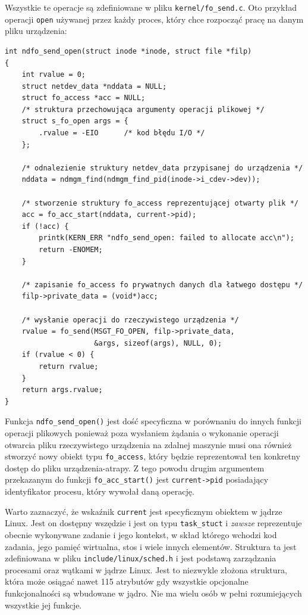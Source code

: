 \documentclass[11pt]{scrartcl}
\begin{document}
Wszystkie te operacje są zdefiniowane w pliku \texttt{kernel/fo\_send.c}. Oto przykład operacji \texttt{open} używanej przez każdy proces, który chce rozpocząć pracę na danym pliku urządzenia:

\begin{verbatim}
int ndfo_send_open(struct inode *inode, struct file *filp)
{
    int rvalue = 0;
    struct netdev_data *nddata = NULL;
    struct fo_access *acc = NULL;
    /* struktura przechowująca argumenty operacji plikowej */
    struct s_fo_open args = {
        .rvalue = -EIO      /* kod błędu I/O */
    };

    /* odnalezienie struktury netdev_data przypisanej do urządzenia */
    nddata = ndmgm_find(ndmgm_find_pid(inode->i_cdev->dev));

    /* stworzenie struktury fo_access reprezentującej otwarty plik */
    acc = fo_acc_start(nddata, current->pid);
    if (!acc) {
        printk(KERN_ERR "ndfo_send_open: failed to allocate acc\n");
        return -ENOMEM;
    }

    /* zapisanie fo_access fo prywatnych danych dla łatwego dostępu */
    filp->private_data = (void*)acc;

    /* wysłanie operacji do rzeczywistego urządzenia */
    rvalue = fo_send(MSGT_FO_OPEN, filp->private_data,
                     &args, sizeof(args), NULL, 0);
    if (rvalue < 0) {
        return rvalue;
    }
    return args.rvalue;
}
\end{verbatim}

Funkcja \texttt{ndfo\_send\_open()} jest dość specyficzna w porównaniu do innych funkcji operacji plikowych ponieważ poza wysłaniem żądania o wykonanie operacji otwarcia pliku rzeczywistego urządzenia na zdalnej maszynie musi ona również stworzyć nowy obiekt typu \texttt{fo\_access}, który będzie reprezentował ten konkretny dostęp do pliku urządzenia-atrapy. Z tego powodu drugim argumentem przekazanym do funkcji \texttt{fo\_acc\_start()} jest \texttt{current-\textgreater{}pid} posiadający identyfikator procesu, który wywołał daną operację.

Warto zaznaczyć, że wskaźnik \texttt{current} jest specyficznym obiektem w jądrze Linux. Jest on dostępny wszędzie i jest on typu \texttt{task\_stuct} i \emph{zawsze} reprezentuje obecnie wykonywane zadanie i jego kontekst, w skład którego wchodzi kod zadania, jego pamięć wirtualna, stos i wiele innych elementów. Struktura ta jest zdefiniowana w pliku \texttt{include/linux/sched.h} i jest podstawą zarządzania procesami oraz wątkami w jądrze Linux. Jest to niezwykle złożona struktura, która może osiągać nawet 115 atrybutów gdy wszystkie opcjonalne funkcjonalności są wbudowane w jądro. Nie ma wielu osób w pełni rozumiejących wszystkie jej funkcje.
\end{document}
